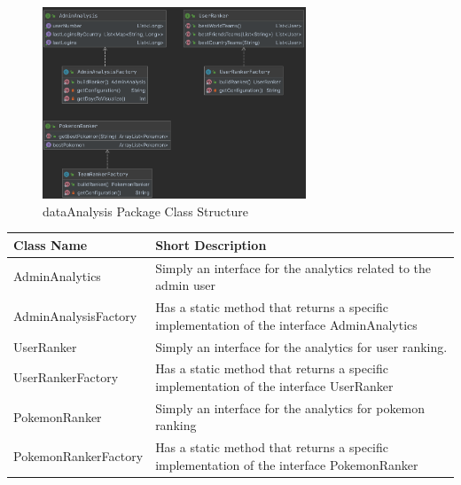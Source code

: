 \begin{figure}[H]
	\centering
	\includegraphics[width=0.7\textwidth]{img/dataAnalysis_package.png}
	\caption{dataAnalysis Package Class Structure}
\end{figure}

\begin{center}
	\begin{tabular}{| m{14em} | m{19em} |} 
		\hline
		\textbf{Class Name} & \textbf{Short Description} \\ [0.5ex] 
		\hline
		AdminAnalytics &Simply an interface for the analytics related to the admin user\\ 
		\hline
		AdminAnalysisFactory & Has a static method that returns a specific implementation of the interface AdminAnalytics\\ 
		\hline
		UserRanker & Simply an interface for the analytics for user ranking.\\ 
		\hline
		UserRankerFactory & Has a static method that returns a specific implementation of the interface UserRanker\\ 
		\hline
		PokemonRanker & Simply an interface for the analytics for pokemon ranking\\ 
		\hline
		PokemonRankerFactory & Has a static method that returns a specific implementation of the interface PokemonRanker\\
		\hline
	\end{tabular}
\end{center}

